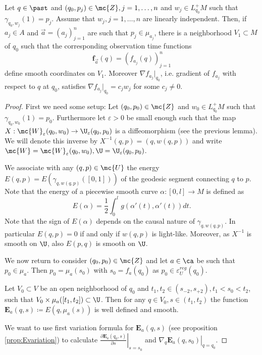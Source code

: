 \begin{proposition}\label{prop:observationtimecoordinates}
Let $q\in\past$ and $(q_0,p_j)\in \mc{Z}, j=1,\dots, n$ and $w_j\in L^+_{q_0}M$ such that $\gamma_{q_0,w_j}(1) = p_j$. Assume that $w_j, j=1,\dots, n$ are linearly independent. Then, if $a_j\in A$ and $\overrightarrow{a} = (a_j)^n_{j=1}$ are such that $p_j\in \mu_{a_j}$, there is a neighborhood $V_1\subset M$ of $q_0$ such that the corresponding observation time functions 
\[
\mathbf{f}_{\overrightarrow{a}}(q) = (f_{a_j}(q))^n_{j=1}
\]
define smooth coordinates on $V_1$. Moreover $\nabla f_{a_j}\rvert_{q_0}$, i.e. gradient of $f_{a_j}$ with respect to $q$ at $q_0$, satisfies $\nabla f_{a_j}\rvert_{q_0} = c_jw_j$ for some $c_j\neq 0$.
\end{proposition}
\begin{proof}
First we need some setup: Let $(q_0,p_0)\in \mc{Z}$ and $w_0\in L^+_{q_0}M$ such that $\gamma_{q_0,w_0}(1) = p_0$. Furthermore let $\varepsilon>0$ be small enough such that the map $X:\mc{W}_\varepsilon(q_0,w_0)\to \U_\varepsilon(q_0,p_0)$ is a diffeomorphism (see the previous lemma). We will denote this inverse by $X^{-1}(q,p) = (q,w(q,p))$ and write $\mc{W}=\mc{W}_\varepsilon(q_0,w_0), \U=\U_\varepsilon(q_0,p_0)$.

We associate with any $(q,p)\in \mc{U}$ the energy $E(q,p)=E(\gamma_{q,w(q,p)}([0,1]))$ of the geodesic segment connecting $q$ to $p$. Note that the energy of a piecewise smooth curve $\alpha:[0,l]\to M$ is defined as 
\[
    E(\alpha) = \frac{1}{2}\int_0^l g(\alpha'(t),\alpha'(t))dt.
\]
Note that the sign of $E(\alpha)$ depends on the causal nature of $\gamma_{q,w(q,p)}$. In particular $E(q,p)=0$ if and only if $w(q,p)$ is light-like. Moreover, as $X^{-1}$ is smooth on $\U$, also $E(p,q)$ is smooth on $\U$.

We now return to consider $(q_0,p_0)\in \mc{Z}$ and let $a\in \ca$ be such that $p_0 \in \mu_a$. Then $p_0=\mu_a(s_0)$ with $s_0=f_a(q_0)$ as $p_0 \in \varepsilon^{reg}_U(q_0)$. 

Let $V_0\subset V$ be an open neighborhood of $q_0$ and $t_1,t_2\in (s_{-2},s_{+2}), t_1<s_0<t_2$, such that $V_0\times\mu_a([t_1,t_2])\subset \U$. Then for any $q\in V_0, s\in (t_1,t_2)$ the function $\mathbf{E}_a(q,s)\coloneqq E(q,\mu_a(s))$ is well defined and smooth.

We want to use first variation formula for $\mathbf{E}_a(q,s)$ (see proposition \ref{prop:Evariation}) to calculate $\left.\frac{\partial\mathbf{E}_a(q_0,s)}{\partial s}\right\rvert_{s=s_0}$ and $\left.\nabla_q\mathbf{E}_a(q,s_0)\right\rvert_{q=q_0}$.


\end{proof}
